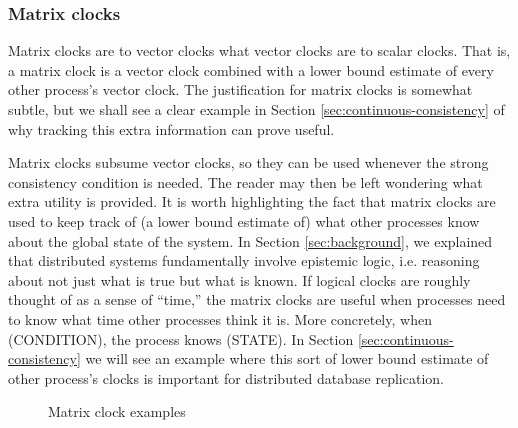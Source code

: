 \documentclass[]             %
{NASA}                       %
\theoremstyle{definition}
\begin{document}

\subsubsection{Matrix clocks}

Matrix clocks are to vector clocks what vector clocks are to scalar
clocks. That is, a matrix clock is a vector clock combined with a
lower bound estimate of every other process's vector clock. The
justification for matrix clocks is somewhat subtle, but we shall see a
clear example in Section \ref{sec:continuous-consistency} of why
tracking this extra information can prove useful.

Matrix clocks subsume vector clocks, so they can be used whenever the
strong consistency condition is needed. The reader may then be left
wondering what extra utility is provided. It is worth highlighting the
fact that matrix clocks are used to keep track of (a lower bound
estimate of) what other processes know about the global state of the
system. In Section \ref{sec:background}, we explained that distributed
systems fundamentally involve epistemic logic, i.e. reasoning about
not just what is true but what is known. If logical clocks are roughly
thought of as a sense of ``time,'' the matrix clocks are useful when
processes need to know what time other processes think it is. More
concretely, when (CONDITION), the process knows (STATE). In Section
\ref{sec:continuous-consistency} we will see an example where this
sort of lower bound estimate of other process's clocks is important
for distributed database replication.


\begin{figure}[p]
  \setlength\belowcaptionskip{5ex}
  \renewcommand*{\arraystretch}{0.9}

  \begin{subfigure}{1\textwidth}
    \centering
    
    \label{fig:message-latencies-matrix-a}
  \end{subfigure}

  \vspace{4ex}

  \begin{subfigure}{1\textwidth}
    
    \label{fig:message-latencies-matrix-b}
  \end{subfigure}

  \begin{subfigure}{1\textwidth}
    
    \label{fig:message-latencies-matrix-c}
  \end{subfigure}

  \caption{Matrix clock examples}
  \label{fig:message-latencies-matrix}
\end{figure}
\end{document}
